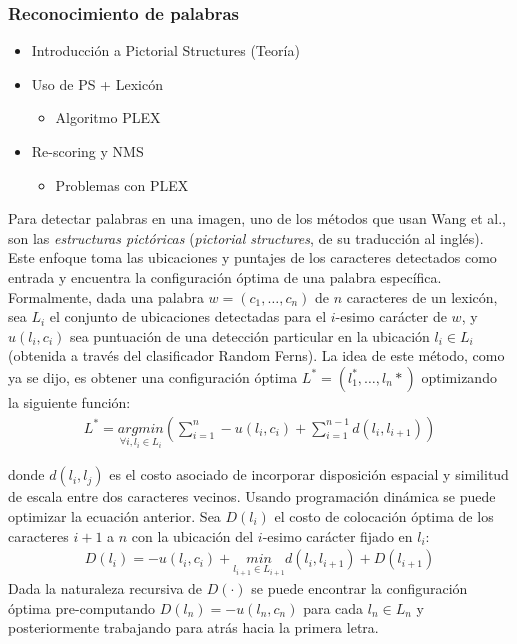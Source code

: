 \subsubsection{Reconocimiento de palabras}
	\begin{itemize}
		\item Introducción a Pictorial Structures (Teoría)
		\item Uso de PS + Lexicón
		\begin{itemize}
			\item Algoritmo PLEX
		\end{itemize}
		\item Re-scoring y NMS
		\begin{itemize}
			\item Problemas con PLEX
		\end{itemize}
	\end{itemize}
	
	Para detectar palabras en una imagen, uno de los métodos que usan Wang et al., son las \textit{estructuras pictóricas} (\textit{pictorial structures}, de su traducción al inglés). Este enfoque toma las ubicaciones y puntajes de los caracteres detectados como entrada y encuentra la configuración óptima de una palabra específica. Formalmente, dada una palabra $w=(c_1,\dots , c_n)$ de $n$ caracteres de un lexicón, sea $L_i$ el conjunto de ubicaciones detectadas para el $i$-esimo carácter de $w$, y $u(l_i, c_i)$ sea puntuación de una detección particular en la ubicación $l_i \in L_i$ (obtenida a través del clasificador Random Ferns). La idea de este método, como ya se dijo, es obtener una configuración óptima $L^{*}=(l_1^{*}, \dots, l_n{*})$ optimizando la siguiente función:
	\begin{align}
		L^{*} = \underset{\forall i, l_i\in L_i}{argmin}\left( \sum_{i=1}^n -u(l_i, c_i) + \sum_{i=1}^{n-1} d(l_i,l_{i+1}) \right)
	\end{align}		
	
	donde $d(l_i, l_j)$ es el costo asociado de incorporar disposición espacial y similitud de escala entre dos caracteres vecinos. Usando programación dinámica se puede optimizar la ecuación anterior. Sea $D(l_i)$ el costo de colocación óptima de los caracteres $i+1$ a $n$ con la ubicación del $i$-esimo carácter fijado en $l_i$:
	\begin{align}
		D(l_i) = -u(l_i,c_i) + \underset{l_{i+1}\in L_{i+1}}{min} d(l_i,l_{i+1}) + D(l_{i+1})
	\end{align}
	Dada la naturaleza recursiva de $D(\cdot)$ se puede encontrar la configuración óptima pre-computando $D(l_n) = -u(l_n,c_n)$ para cada $l_n \in L_n$ y posteriormente trabajando para atrás hacia la primera letra.
	
